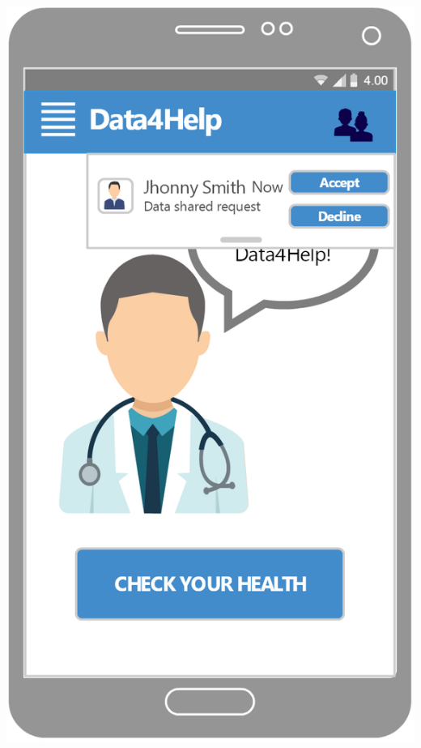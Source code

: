 \begin{center}
\begin{minipage}[c]{.40\textwidth}
\includegraphics[width=1\textwidth]{Images/userInterface/ManageRequest}
\end{minipage}
\end{center}

